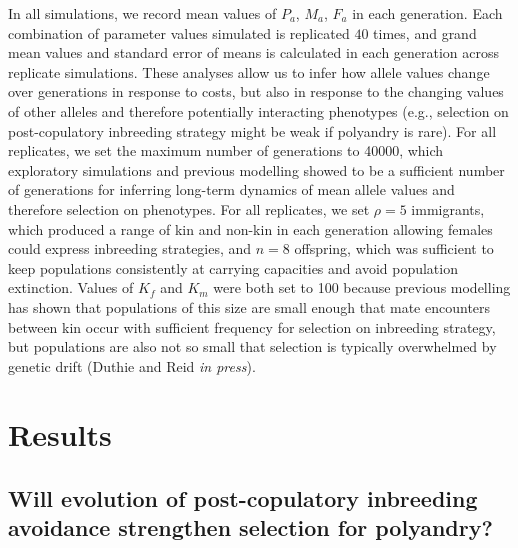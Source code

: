 \documentclass[10pt,letterpaper]{article}
\begin{document}
In all simulations, we record mean values of $P_{a}$, $M_{a}$, $F_{a}$ in each generation. Each combination of parameter values simulated is replicated $40$ times, and grand mean values and standard error of means is calculated in each generation across replicate simulations. These analyses allow us to infer how allele values change over generations in response to costs, but also in response to the changing values of other alleles and therefore potentially interacting phenotypes (e.g., selection on post-copulatory inbreeding strategy might be weak if polyandry is rare). For all replicates, we set the maximum number of generations to 40000, which exploratory simulations and previous modelling \cite[][]{Duthie} showed to be a sufficient number of generations for inferring long-term dynamics of mean allele values and therefore selection on phenotypes.  For all replicates, we set $\rho=5$ immigrants, which produced a range of kin and non-kin in each generation allowing females could express inbreeding strategies, and $n=8$ offspring, which was sufficient to keep populations consistently at carrying capacities and avoid population extinction. Values of $K_{f}$ and $K_{m}$ were both set to 100 because previous modelling has shown that populations of this size are small enough that mate encounters between kin occur with sufficient frequency for selection on inbreeding strategy, but populations are also not so small that selection is typically overwhelmed by genetic drift (Duthie and Reid \textit{in press}).


\section*{Results}

\subsection*{Will evolution of post-copulatory inbreeding avoidance strengthen selection for polyandry?}
\end{document}
